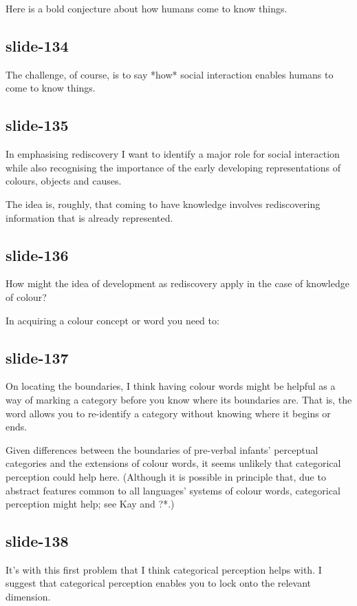 \documentclass[12pt,\papersize]{extarticle}
\begin{document}
Here is a bold conjecture about how humans come to know things.

\subsection{slide-134}
The challenge, of course, is to say *how* social interaction enables humans to come to know
things.

\subsection{slide-135}
In emphasising rediscovery I want to identify a major role for social interaction while
also recognising the importance of the early developing representations of colours, objects
and causes.

The idea is, roughly, that coming to have knowledge involves rediscovering information that is
already represented.

\subsection{slide-136}
How might the idea of development as rediscovery apply in the case of knowledge of colour?

In acquiring a colour concept or word you need to:

\subsection{slide-137}
On locating the boundaries, I think having colour words might be helpful as a way of
marking a category before you know where its boundaries are.
That is, the word allows you to re-identify a category without knowing where it begins
or ends.

Given differences between the boundaries of pre-verbal infants' perceptual categories
and the extensions of colour words, it seems unlikely that categorical perception could
help here.  (Although it is possible in principle that, due to abstract features common to
all languages' systems of colour words, categorical perception might help; see Kay and ?*.)

\subsection{slide-138}
It's with this first problem that I think categorical perception helps with.
I suggest that categorical perception enables you to lock onto the relevant dimension.
\end{document}
